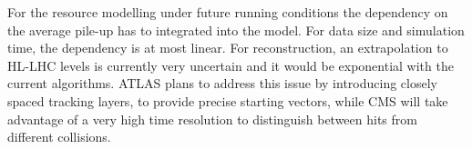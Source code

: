 For the resource modelling under future running conditions the
dependency on the average pile-up has to integrated into the
model. For data size and simulation time, the dependency is at most
linear. For reconstruction, an extrapolation to HL-LHC levels is
currently very uncertain and it would be exponential with the current
algorithms. ATLAS plans to address this issue by introducing closely
spaced tracking layers, to provide precise starting vectors, while CMS
will take advantage of a very high time resolution to distinguish
between hits from different collisions.
